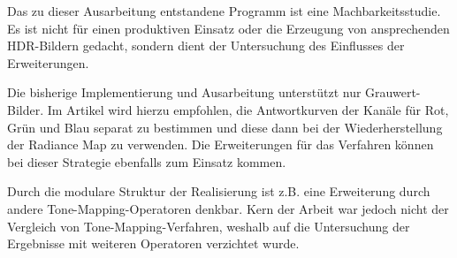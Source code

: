 Das zu dieser Ausarbeitung entstandene Programm ist eine Machbarkeitsstudie. Es ist nicht für einen produktiven Einsatz oder die Erzeugung von ansprechenden \gls{HDR}-Bildern gedacht, sondern dient der Untersuchung des Einflusses der Erweiterungen.

Die bisherige Implementierung und Ausarbeitung unterstützt nur Grauwert-Bilder. Im Artikel \cite{paper} wird hierzu empfohlen, die Antwortkurven der Kanäle für Rot, Grün und Blau separat zu bestimmen und diese dann bei der Wiederherstellung der \gls{Radiance Map} zu verwenden. Die Erweiterungen für das Verfahren können bei dieser Strategie ebenfalls zum Einsatz kommen. 

Durch die modulare Struktur der Realisierung ist z.B. eine Erweiterung durch andere \gls{Tone-Mapping}-Operatoren denkbar. Kern der Arbeit war jedoch nicht der Vergleich von \gls{Tone-Mapping}-Verfahren, weshalb auf die Untersuchung der Ergebnisse mit weiteren Operatoren verzichtet wurde.
